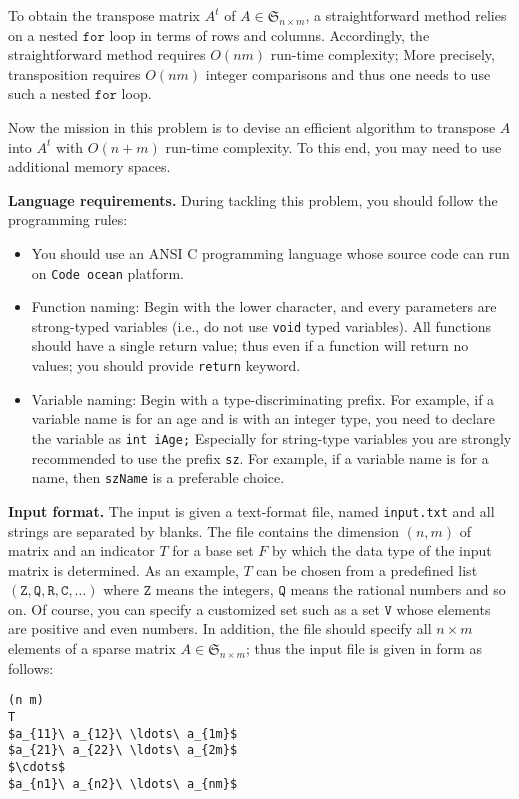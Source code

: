 \documentclass{article}
\newcommand{\sm}[2]{{\mathfrak{S}_{#1\times #2}}}
\begin{document}
To obtain the transpose matrix $A^t$ of $A\in\sm{n}{m}$, a straightforward method relies on a nested $\mathtt{for}$ loop  
in terms of rows and columns. Accordingly, the straightforward method requires $O(nm)$ run-time complexity; 
More precisely, transposition requires $O(nm)$ integer comparisons and thus one needs to use such a nested $\mathtt{for}$
loop.


Now the mission in this problem is to devise an efficient algorithm to transpose $A$ into $A^t$ with 
$O(n+m)$ run-time complexity. To this end, you may need to use additional memory spaces.


\bigskip
\noindent\textbf{Language requirements. }%
During tackling this problem, you should follow the programming rules:
\begin{itemize}
\item You should use an ANSI C programming language whose source code can run on \texttt{Code ocean} platform. 
\item Function naming: Begin with the lower character, and every parameters are strong-typed variables (i.e., do not use \texttt{void} typed variables).
	All functions should have a single return value; thus even if a function will return no values; you should provide \texttt{return} keyword.
\item Variable naming: Begin with a type-discriminating prefix. For example, if a variable name is for an age and is with an integer type,
	you need to declare the variable as \texttt{int iAge;}  Especially for string-type variables you are strongly recommended to use the prefix \texttt{sz}.
	For example, if a variable name is for a name, then \texttt{szName} is a preferable choice.
\end{itemize}


\bigskip
\noindent\textbf{Input format.} %
The input is given a text-format file, named \texttt{input.txt} and all strings are separated by blanks.
The file contains the dimension $(n,m)$ of matrix and an indicator $T$ for a base set $F$ by which 
the data type of the input matrix is determined. %
As an example, $T$ can be chosen from a predefined list 
$(\mathtt{Z},\mathtt{Q},\mathtt{R},\mathtt{C},\ldots)$ where $\mathtt{Z}$ means the integers, $\mathtt{Q}$ 
means the rational numbers and so on. Of course, you can specify a customized set such as a set $\mathtt{V}$
whose elements are positive and even numbers.
In addition, the file should specify all $n\times m$ elements of a sparse matrix $A\in\sm{n}{m}$; thus the input file is given in form as follows:
\begin{lstlisting}[backgroundcolor=\color{yellow!40}]
(n m)
T
$a_{11}\ a_{12}\ \ldots\ a_{1m}$
$a_{21}\ a_{22}\ \ldots\ a_{2m}$
$\cdots$
$a_{n1}\ a_{n2}\ \ldots\ a_{nm}$
\end{lstlisting}
\end{document}
